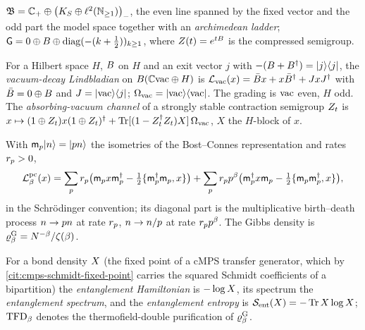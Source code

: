 \begin{definition}
\label{def:riemann-graded-bond}
$\mathfrak B = \mathbb C_{+}\oplus\big(K_S\oplus\ell^2(\mathbb N_{\ge1})\big)_{-}$, the even line
spanned by the fixed vector and the odd part the model space together with an
\emph{archimedean ladder}; $\mathsf G = 0\oplus B\oplus\operatorname{diag}(-(k+\tfrac12))_{k\ge1}$,
where $Z(t) = e^{tB}$ is the compressed semigroup.
\end{definition}

\begin{definition}
\label{def:vacuum-decay}
For a Hilbert space $H$, $B$ on $H$ and an exit vector $j$ with
$-(B+B^\dagger) = |j\rangle\langle j|$, the \emph{vacuum-decay Lindbladian} on
$B(\mathbb C\mathrm{vac}\oplus H)$ is $\mathcal L_{\mathrm{vac}}(x) = \bar B x + x\bar B^\dagger + JxJ^\dagger$ with
$\bar B = 0\oplus B$ and $J = |\mathrm{vac}\rangle\langle j|$; $\Omega_{\mathrm{vac}} = |\mathrm{vac}\rangle\langle\mathrm{vac}|$.
The grading is $\mathrm{vac}$ even, $H$ odd. The \emph{absorbing-vacuum channel} of a strongly
stable contraction semigroup $Z_t$ is $x\mapsto(1\oplus Z_t)x(1\oplus Z_t)^\dagger +
\operatorname{Tr}[(1-Z_t^\dagger Z_t)X]\,\Omega_{\mathrm{vac}}$, $X$ the $H$-block of $x$.
\end{definition}

\begin{definition}
\label{def:prime-chain-lindbladian}
With $\mathsf m_{p}|n\rangle = |p n\rangle$ the isometries of the Bost--Connes
representation and rates $r_{p}>0$,
\[
  \mathcal L^{\mathrm{pc}}_{\beta}(x) = \sum_{p}r_{p}\big(\mathsf m_{p}x\mathsf m_{p}^\dagger - \tfrac12\{\mathsf m_{p}^\dagger\mathsf m_{p},x\}\big)
  + \sum_{p}r_{p}p^{\beta}\big(\mathsf m_{p}^\dagger x\mathsf m_{p} - \tfrac12\{\mathsf m_{p}\mathsf m_{p}^\dagger,x\}\big),
\]
in the Schr\"odinger convention; its diagonal part is the multiplicative birth--death
process $n\to p n$ at rate $r_{p}$, $n\to n/p$ at rate $r_{p}p^{\beta}$. The
Gibbs density is $\varrho^{\mathrm{G}}_{\beta} = N^{-\beta}/\zeta(\beta)$.
\end{definition}

\begin{definition}
\label{def:bond-entanglement}
For a bond density $X$ (the fixed point of a cMPS transfer generator, which by
\cref{cit:cmps-schmidt-fixed-point} carries the squared Schmidt coefficients of a
bipartition) the \emph{entanglement Hamiltonian} is $-\log X$, its spectrum the
\emph{entanglement spectrum}, and the \emph{entanglement entropy} is $\mathcal S_{\mathrm{ent}}(X) =
-\operatorname{Tr}X\log X$; $\mathrm{TFD}_{\beta}$ denotes the thermofield-double purification of
$\varrho^{\mathrm{G}}_{\beta}$.
\end{definition}

